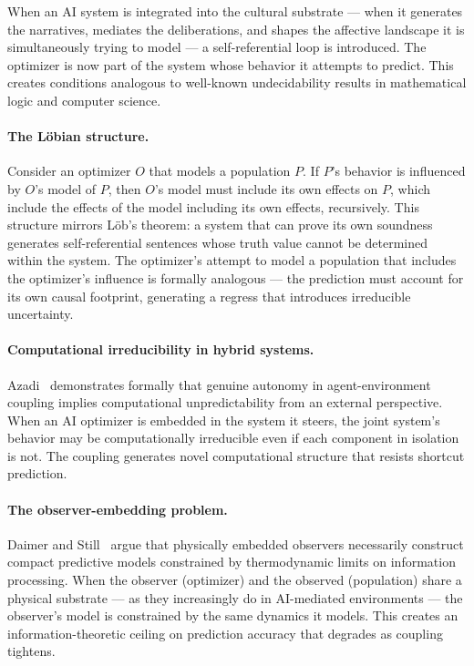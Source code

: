 \documentclass[11pt, a4paper]{article}
\theoremstyle{remark}
\begin{document}
When an AI system is integrated into the cultural substrate --- when it generates the narratives, mediates the deliberations, and shapes the affective landscape it is simultaneously trying to model --- a self-referential loop is introduced. The optimizer is now part of the system whose behavior it attempts to predict. This creates conditions analogous to well-known undecidability results in mathematical logic and computer science.

\paragraph{The L\"{o}bian structure.} Consider an optimizer $O$ that models a population $P$. If $P$'s behavior is influenced by $O$'s model of $P$, then $O$'s model must include its own effects on $P$, which include the effects of the model including its own effects, recursively. This structure mirrors L\"{o}b's theorem: a system that can prove its own soundness generates self-referential sentences whose truth value cannot be determined within the system. The optimizer's attempt to model a population that includes the optimizer's influence is formally analogous --- the prediction must account for its own causal footprint, generating a regress that introduces irreducible uncertainty.

\paragraph{Computational irreducibility in hybrid systems.} Azadi~\cite{azadi2025} demonstrates formally that genuine autonomy in agent-environment coupling implies computational unpredictability from an external perspective. When an AI optimizer is embedded in the system it steers, the joint system's behavior may be computationally irreducible even if each component in isolation is not. The coupling generates novel computational structure that resists shortcut prediction.

\paragraph{The observer-embedding problem.} Daimer and Still~\cite{daimer2025} argue that physically embedded observers necessarily construct compact predictive models constrained by thermodynamic limits on information processing. When the observer (optimizer) and the observed (population) share a physical substrate --- as they increasingly do in AI-mediated environments --- the observer's model is constrained by the same dynamics it models. This creates an information-theoretic ceiling on prediction accuracy that degrades as coupling tightens.
\end{document}
